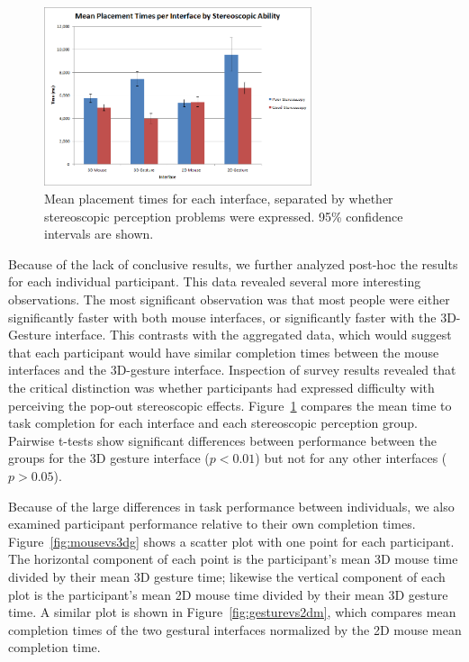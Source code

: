 \documentclass[pageno]{jpaper}
\begin{document}
\begin{figure}
\centering
\includegraphics[width=0.7\textwidth]{figures/mean.png}
\caption{Mean placement times for each interface, separated by whether
stereoscopic perception problems were expressed. 95\% confidence intervals are
shown.}
\label{fig:sepmean}
\end{figure}
Because of the lack of conclusive results, we further analyzed post-hoc the results for each individual participant. This data revealed several more interesting observations.
The most significant observation was that most people were either significantly faster with both mouse interfaces, or significantly faster with the 3D-Gesture interface.
This contrasts with the aggregated data, which would suggest that each participant would have similar completion times between the mouse interfaces and the 3D-gesture
interface. Inspection of survey results revealed that the critical distinction
was whether participants had expressed difficulty with perceiving
the pop-out stereoscopic effects. Figure~\ref{fig:sepmean} compares the mean
time to task completion for each interface and each stereoscopic perception
group. Pairwise t-tests show significant differences between performance between
the groups for the 3D gesture interface ($p < 0.01$) but not for any other
interfaces ($p > 0.05$).

Because of the large differences in task performance between individuals, we
also examined participant performance relative to their own completion times.
Figure~\ref{fig:mousevs3dg} shows a scatter plot with one point for each
participant. The horizontal component of each point is the participant's mean 3D
mouse time divided by their mean 3D gesture time; likewise the vertical
component of each plot is the participant's mean 2D mouse time divided by their
mean 3D gesture time.  A similar plot is shown in Figure~\ref{fig:gesturevs2dm},
which compares mean completion times of the two gestural interfaces normalized
by the 2D mouse mean completion time.
\end{document}
